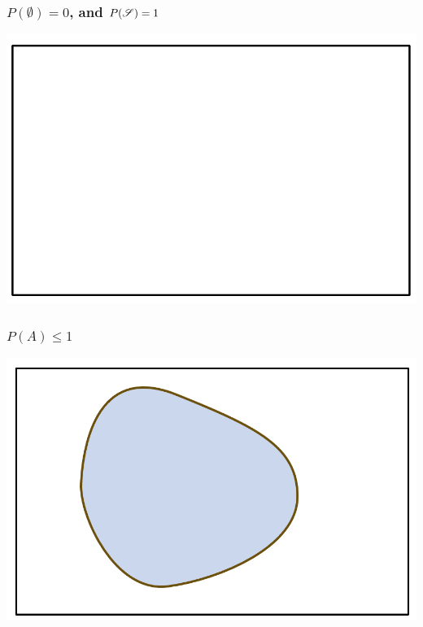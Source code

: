 \documentclass[compress]{beamer}
\begin{document}
\begin{frame}\frametitle{  $P(\emptyset)= 0$, and   $P(\mathscr{S})= 1$}
\begin{center}
\includegraphics[scale=.45]{figs/SampleSpace.png} 
\end{center}
\vspace{1in}
\end{frame}


\begin{frame}\frametitle{  $P(A)\leq 1$}
\begin{center}
\includegraphics[scale=.4]{figs/PALess1.png} 
\end{center}
\vspace{1in}
\end{frame}
\end{document}

